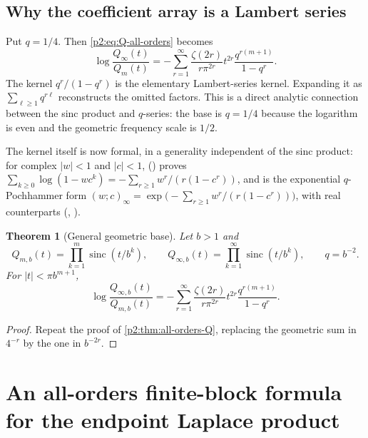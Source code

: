 \documentclass[11pt,oneside]{article}
\numberwithin{equation}{section}
\newtheorem{theorem}{Theorem}[section]
\theoremstyle{definition}
\theoremstyle{remark}
\newcommand{\sinc}{\operatorname{sinc}}
\begin{document}
\subsection{Why the coefficient array is a Lambert series}

Put $q=1/4$.  Then \eqref{p2:eq:Q-all-orders} becomes
\begin{equation}
 \log\frac{Q_\infty(t)}{Q_m(t)}
 =-\sum_{r=1}^{\infty}
 \frac{\zeta(2r)}{r\pi^{2r}}t^{2r}
 \frac{q^{r(m+1)}}{1-q^r}.
 \label{p2:eq:Q-Lambert}
\end{equation}
The kernel $q^r/(1-q^r)$ is the elementary Lambert-series kernel.  Expanding it as
$\sum_{\ell\ge1}q^{r\ell}$ reconstructs the omitted factors.  This is a direct analytic
connection between the sinc product and $q$-series: the base is $q=1/4$ because the logarithm
is even and the geometric frequency scale is $1/2$.

The kernel itself is now formal, in a generality independent of the sinc product: for complex
$|w|<1$ and $|c|<1$,  ()
proves $\sum_{k\ge0}\log(1-wc^k)=-\sum_{r\ge1}w^r/(r(1-c^r))$, and
 is the exponential $q$-Pochhammer form
$(w;c)_\infty=\exp\bigl(-\sum_{r\ge1}w^r/(r(1-c^r))\bigr)$, with real counterparts
(,
).

\begin{theorem}[General geometric base]
\label{p2:thm:base-b}
Let $b>1$ and
\[
 Q_{m,b}(t)=\prod_{k=1}^{m}\sinc(t/b^k),\qquad
 Q_{\infty,b}(t)=\prod_{k=1}^{\infty}\sinc(t/b^k),\qquad q=b^{-2}.
\]
For $|t|<\pi b^{m+1}$,
\begin{equation}
 \boxed{
 \log\frac{Q_{\infty,b}(t)}{Q_{m,b}(t)}
 =-\sum_{r=1}^{\infty}\frac{\zeta(2r)}{r\pi^{2r}}t^{2r}
 \frac{q^{r(m+1)}}{1-q^r}.}
 \label{p2:eq:base-b}
\end{equation}
\newresult
\end{theorem}

\begin{proof}
Repeat the proof of \cref{p2:thm:all-orders-Q}, replacing the geometric sum in $4^{-r}$ by the
one in $b^{-2r}$.
\end{proof}

\section{An all-orders finite-block formula for the endpoint Laplace product}
\label{p2:sec:Laplace-tail}
\end{document}
